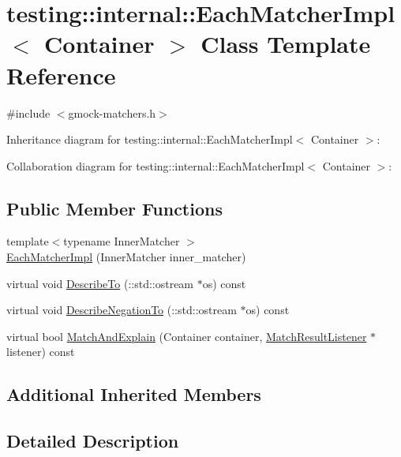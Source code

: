 \hypertarget{classtesting_1_1internal_1_1_each_matcher_impl}{}\section{testing\+:\+:internal\+:\+:Each\+Matcher\+Impl$<$ Container $>$ Class Template Reference}
\label{classtesting_1_1internal_1_1_each_matcher_impl}


{\ttfamily \#include $<$gmock-\/matchers.\+h$>$}



Inheritance diagram for testing\+:\+:internal\+:\+:Each\+Matcher\+Impl$<$ Container $>$\+:


Collaboration diagram for testing\+:\+:internal\+:\+:Each\+Matcher\+Impl$<$ Container $>$\+:
\subsection*{Public Member Functions}
\begin{DoxyCompactItemize}
\item 
{\footnotesize template$<$typename Inner\+Matcher $>$ }\\\hyperlink{classtesting_1_1internal_1_1_each_matcher_impl_afe41214bf055abcdd60e475f207c7a0f}{Each\+Matcher\+Impl} (Inner\+Matcher inner\+\_\+matcher)
\item 
virtual void \hyperlink{classtesting_1_1internal_1_1_each_matcher_impl_a6a54a94c14435378e22e8b31670be0b8}{Describe\+To} (\+::std\+::ostream $\ast$os) const 
\item 
virtual void \hyperlink{classtesting_1_1internal_1_1_each_matcher_impl_a52941ed863914b8fd2dba5c229b57f30}{Describe\+Negation\+To} (\+::std\+::ostream $\ast$os) const 
\item 
virtual bool \hyperlink{classtesting_1_1internal_1_1_each_matcher_impl_a1c84c5cf88a78eed95c7bebf008f567c}{Match\+And\+Explain} (Container container, \hyperlink{classtesting_1_1_match_result_listener}{Match\+Result\+Listener} $\ast$listener) const 
\end{DoxyCompactItemize}
\subsection*{Additional Inherited Members}


\subsection{Detailed Description}
